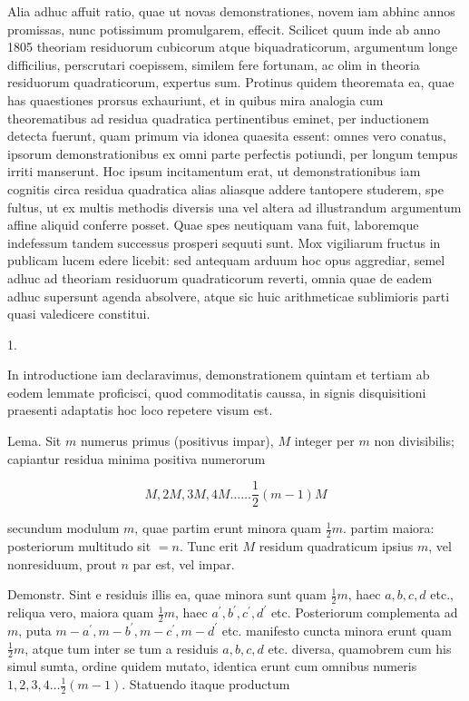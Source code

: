 \documentclass[10pt]{article}
\begin{document}
Alia adhuc affuit ratio, quae ut novas demonstrationes, novem iam abhinc annos promissas, nunc potissimum promulgarem, effecit. Scilicet quum inde ab anno 1805 theoriam residuorum cubicorum atque biquadraticorum, argumentum longe difficilius, perscrutari coepissem, similem fere fortunam, ac olim in theoria residuorum quadraticorum, expertus sum. Protinus quidem theoremata ea, quae has quaestiones prorsus exhauriunt, et in quibus mira analogia cum theorematibus ad residua quadratica pertinentibus eminet, per inductionem detecta fuerunt, quam primum via idonea quaesita essent: omnes vero conatus, ipsorum demonstrationibus ex omni parte perfectis potiundi, per longum tempus irriti manserunt. Hoc ipsum incitamentum erat, ut demonstrationibus iam cognitis circa residua quadratica alias aliasque addere tantopere studerem, spe fultus, ut ex multis methodis diversis una vel altera ad illustrandum argumentum affine aliquid conferre posset. Quae spes neutiquam vana fuit, laboremque indefessum tandem successus prosperi sequuti sunt. Mox vigiliarum fructus in publicam lucem edere licebit: sed antequam arduum hoc opus aggrediar, semel adhuc ad theoriam residuorum quadraticorum reverti, omnia quae de eadem adhuc supersunt agenda absolvere, atque sic huic arithmeticae sublimioris parti quasi valedicere constitui.

1.

In introductione iam declaravimus, demonstrationem quintam et tertiam ab eodem lemmate proficisci, quod commoditatis caussa, in signis disquisitioni praesenti adaptatis hoc loco repetere visum est.

Lema. Sit \(m\) numerus primus (positivus impar), \(M\) integer per \(m\) non divisibilis; capiantur residua minima positiva numerorum

\[
M, 2 M, 3 M, 4 M \ldots \ldots \frac{1}{2}(m-1) M
\]

secundum modulum \(m\), quae partim erunt minora quam \(\frac{1}{2} m\). partim maiora: posteriorum multitudo sit \(=n\). Tunc erit \(M\) residum quadraticum ipsius \(m\), vel nonresiduum, prout \(n\) par est, vel impar.

Demonstr. Sint e residuis illis ea, quae minora sunt quam \(\frac{1}{2} m\), haec \(a, b, c, d\) etc., reliqua vero, maiora quam \(\frac{1}{2} m\), haec \(a^{\prime}, b^{\prime}, c^{\prime}, d^{\prime}\) etc. Posteriorum complementa ad \(m\), puta \(m-a^{\prime}, m-b^{\prime}, m-c^{\prime}, m-d^{\prime}\) etc. manifesto cuncta minora erunt quam \(\frac{1}{2} m\), atque tum inter se tum a residuis \(a, b, c, d\) etc. diversa, quamobrem cum his simul sumta, ordine quidem mutato, identica erunt cum omnibus numeris \(1,2,3,4 \ldots \frac{1}{2}(m-1)\). Statuendo itaque productum
\end{document}
